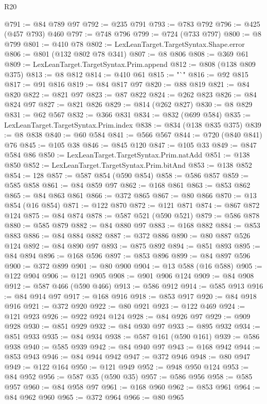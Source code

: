 \begin{lexlean}{R20}
\begin{coremodule}
@791 := @84 @789 @97
@792 := @235 @791
@793 := @783 @792
@796 := @425 (@457 @793) @460
@797 := @748 @796
@799 := @724 (@733 @797)
@800 := @8 @799
@801 := @410 @78
@802 := LexLeanTarget.TargetSyntax.Shape.error
@806 := @801 (@132 @802 @78 @341)
@807 := @8 @806
@808 := @369 @61
@809 := LexLeanTarget.TargetSyntax.Prim.append
@812 := @808 (@138 @809 @375)
@813 := @8 @812
@814 := @410 @61
@815 := "`"
@816 := @92 @815
@817 := @91 @816
@819 := @84 @817 @97
@820 := @88 @819
@821 := @84 @820
@822 := @821 @97
@823 := @87 @822
@824 := @262 @823
@826 := @84 @824 @97
@827 := @821 @826
@829 := @814 (@262 @827)
@830 := @8 @829
@831 := @62 @567
@832 := @366 @831
@834 := @832 (@699 @584)
@835 := LexLeanTarget.TargetSyntax.Prim.index
@838 := @834 (@138 @835 @375)
@839 := @8 @838
@840 := @60 @584
@841 := @566 @567
@844 := @720 (@840 @841) @76
@845 := @105 @38
@846 := @845 @120
@847 := @105 @33
@849 := @847 @584 @86
@850 := LexLeanTarget.TargetSyntax.Prim.natAdd
@851 := @138 @850
@852 := LexLeanTarget.TargetSyntax.Prim.bitAnd
@853 := @138 @852
@854 := 128
@857 := @587 @854 (@590 @854)
@858 := @586 @857
@859 := @585 @858
@861 := @84 @859 @97
@862 := @168 @861
@863 := @853 @862
@865 := @84 @863 @861
@866 := @372 @865
@867 := @80 @866
@870 := @13 @854 (@16 @854)
@871 := @122 @870
@872 := @121 @871
@874 := @867 @872 @124
@875 := @84 @874
@878 := @587 @521 (@590 @521)
@879 := @586 @878
@880 := @585 @879
@882 := @84 @880 @97
@883 := @168 @882
@884 := @853 @883
@886 := @84 @884 @882
@887 := @372 @886
@890 := @80 @887 @526 @124
@892 := @84 @890 @97
@893 := @875 @892
@894 := @851 @893
@895 := @84 @894
@896 := @168 @596
@897 := @853 @896
@899 := @84 @897 @596
@900 := @372 @899
@901 := @80 @900
@904 := @13 @588 (@16 @588)
@905 := @122 @904
@906 := @121 @905
@908 := @901 @906 @124
@909 := @84 @908
@912 := @587 @466 (@590 @466)
@913 := @586 @912
@914 := @585 @913
@916 := @84 @914 @97
@917 := @168 @916
@918 := @853 @917
@920 := @84 @918 @916
@921 := @372 @920
@922 := @80 @921
@923 := @122 @469
@924 := @121 @923
@926 := @922 @924 @124
@928 := @84 @926 @97
@929 := @909 @928
@930 := @851 @929
@932 := @84 @930 @97
@933 := @895 @932
@934 := @851 @933
@935 := @84 @934
@938 := @587 @161 (@590 @161)
@939 := @586 @938
@940 := @585 @939
@942 := @84 @940 @97
@943 := @168 @942
@944 := @853 @943
@946 := @84 @944 @942
@947 := @372 @946
@948 := @80 @947
@949 := @122 @164
@950 := @121 @949
@952 := @948 @950 @124
@953 := @84 @952
@956 := @587 @35 (@590 @35)
@957 := @586 @956
@958 := @585 @957
@960 := @84 @958 @97
@961 := @168 @960
@962 := @853 @961
@964 := @84 @962 @960
@965 := @372 @964
@966 := @80 @965

\end{coremodule}
\end{lexlean}
